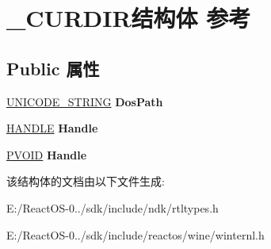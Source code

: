 \hypertarget{struct___c_u_r_d_i_r}{}\section{\+\_\+\+C\+U\+R\+D\+I\+R结构体 参考}
\label{struct___c_u_r_d_i_r}
\subsection*{Public 属性}
\begin{DoxyCompactItemize}
\item 
\mbox{\label{struct___c_u_r_d_i_r_aa2e36e74b2c3d8d31ab99df9d5dca8e5}} 
\hyperlink{struct___u_n_i_c_o_d_e___s_t_r_i_n_g}{U\+N\+I\+C\+O\+D\+E\+\_\+\+S\+T\+R\+I\+NG} {\bfseries Dos\+Path}
\item 
\mbox{\label{struct___c_u_r_d_i_r_a003d9d9e35f6dfea32b52b2e1a017d8b}} 
\hyperlink{interfacevoid}{H\+A\+N\+D\+LE} {\bfseries Handle}
\item 
\mbox{\label{struct___c_u_r_d_i_r_abcc34bab200ed79c62da5f9cd06ecfb8}} 
\hyperlink{interfacevoid}{P\+V\+O\+ID} {\bfseries Handle}
\end{DoxyCompactItemize}


该结构体的文档由以下文件生成\+:\begin{DoxyCompactItemize}
\item 
E\+:/\+React\+O\+S-\/0../sdk/include/ndk/rtltypes.\+h\item 
E\+:/\+React\+O\+S-\/0../sdk/include/reactos/wine/winternl.\+h\end{DoxyCompactItemize}
